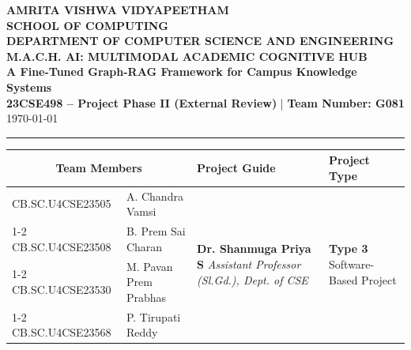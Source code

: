 \documentclass[11pt, a4paper]{article}
\begin{document}
\noindent
\begin{minipage}{\textwidth}
    \centering
    {\Large \textbf{\textcolor{amritaMaroon}{
    AMRITA VISHWA VIDYAPEETHAM \\
    SCHOOL OF COMPUTING \\
    DEPARTMENT OF COMPUTER SCIENCE AND ENGINEERING \\
    }}}
    \vspace{0.2cm}
    {\large \textbf{M.A.C.H. AI: MULTIMODAL ACADEMIC COGNITIVE HUB}} \\[0.08cm]
    {\normalsize \textbf{A Fine-Tuned Graph-RAG Framework for Campus Knowledge Systems}} \\[0.12cm]
    \textbf{23CSE498 -- Project Phase II (External Review)} \quad | \quad \textbf{Team Number: G081} \\
    \today
\end{minipage}

\vspace{0.3cm}
\hrule
\vspace{0.3cm}

\noindent
\begin{center}
    \renewcommand{\arraystretch}{1.40}
    \setlength{\tabcolsep}{6pt}
    \begin{tabular}{|l|p{4.8cm}|p{4.6cm}|p{3.2cm}|}
        \hline
        \multicolumn{2}{|c|}{\textbf{Team Members}} & \textbf{Project Guide} & \textbf{Project Type} \\
        \hline
        \small CB.SC.U4CSE23505 & \small \raggedright A. Chandra Vamsi &
        \multirow{4}{=}{\raggedright \small \textbf{Dr. Shanmuga Priya S} \newline \textit{Assistant Professor (Sl.Gd.), \newline Dept. of CSE}} &
        \multirow{4}{=}{\raggedright \small \textbf{Type 3} \newline Software-Based Project} \\ \cline{1-2}
        \small CB.SC.U4CSE23508 & \small B. Prem Sai Charan & & \\ \cline{1-2}
        \small CB.SC.U4CSE23530 & \small M. Pavan Prem Prabhas & & \\ \cline{1-2}
        \small CB.SC.U4CSE23568 & \small P. Tirupati Reddy & & \\
        \hline
    \end{tabular}
\end{center}
\vspace{0.2cm}
\end{document}
